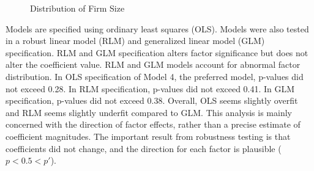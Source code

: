 \documentclass[review]{elsarticle}
\begin{document}
\begin{figure}[h!]
    \centering
    \caption{Distribution of Firm Size}
    \label{fig:firm_size}
\end{figure}

Models are specified using ordinary least squares (OLS).
Models were also tested in a robust linear model (RLM) and generalized linear model (GLM) specification.
RLM and GLM specification alters factor significance but does not alter the coefficient value.
RLM and GLM models account for abnormal factor distribution.
In OLS specification of Model 4, the preferred model, p-values did not exceed 0.28.
In RLM specification, p-values did not exceed 0.41.
In GLM specification, p-values did not exceed 0.38.
Overall, OLS seems slightly overfit and RLM seems slightly underfit compared to GLM.
This analysis is mainly concerned with the direction of factor effects,
rather than a precise estimate of coefficient magnitudes.
The important result from robustness testing is that coefficients did not change,
and the direction for each factor is plausible ($p < 0.5 < p'$).
\end{document}

